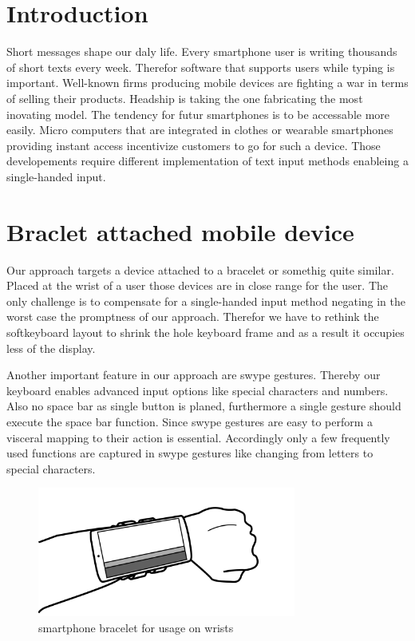\documentclass{acm_proc_article-sp}
\begin{document}
\section{Introduction}
Short messages shape our daly life. Every smartphone user is writing thousands of short texts every week. Therefor software that supports users while typing is important. Well-known firms producing mobile devices are fighting a war in terms of selling their products. Headship is taking the one fabricating the most inovating model. The tendency for futur smartphones is to be accessable more easily. Micro computers that are integrated in clothes or wearable smartphones providing instant access incentivize customers to go for such a device. Those developements require different implementation of text input methods enableing a single-handed input.
\section{Braclet attached mobile device}
Our approach targets a device attached to a bracelet or somethig quite similar. Placed at the wrist of a user those devices are in close range for the user. The only challenge is to compensate for a single-handed input method negating in the worst case the promptness of our approach. Therefor we have to rethink the softkeyboard layout to shrink the hole keyboard frame and as a result it occupies less of the display.

Another important feature in our approach are swype gestures. Thereby our keyboard enables advanced input options like special characters and numbers. Also no space bar as single button is planed, furthermore a single gesture should execute the space bar function. Since swype gestures are easy to perform a visceral mapping to their action is essential. Accordingly only a few frequently used functions are captured in swype gestures like changing from letters to special characters. 
\begin{figure}[htb]
  \begin{center}
    \includegraphics[width=85mm]{demo.png}
    \caption{smartphone bracelet for usage on wrists}
    \label{detection}
  \end{center}
\end{figure}
\end{document}
